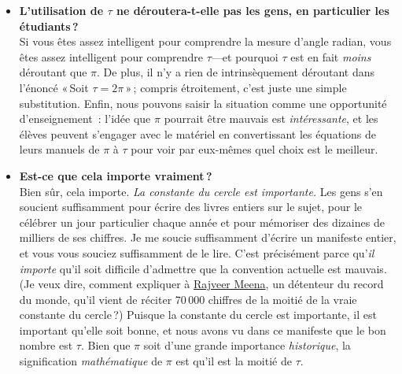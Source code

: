 \begin{itemize}
  \item \textbf{L'utilisation de $\tau$ ne déroutera-t-elle pas les gens, en particulier les étudiants\,?} \\  Si vous êtes assez intelligent pour comprendre la mesure d'angle radian, vous êtes assez intelligent pour comprendre $\tau$---et pourquoi $\tau$ est en fait \emph{moins} déroutant que $\pi$. De plus, il n'y a rien de intrinsèquement déroutant dans l'énoncé «\,Soit $\tau=2\pi$\,»\,; compris étroitement, c'est juste une simple substitution. Enfin, nous pouvons saisir la situation comme une opportunité d'enseignement~: l'idée que $\pi$ pourrait être mauvais est \emph{intéressante}, et les élèves peuvent s'engager avec le matériel en convertissant les équations de leurs manuels de $\pi$ à $\tau$ pour voir par eux-mêmes quel choix est le meilleur.

  \item \textbf{Est-ce que cela importe vraiment\,?} \\ Bien sûr, cela importe. \emph{La constante du cercle est importante.} Les gens s'en soucient suffisamment pour écrire des livres entiers sur le sujet, pour le célébrer un jour particulier chaque année et pour mémoriser des dizaines de milliers de ses chiffres. Je me soucie suffisamment d'écrire un manifeste entier, et vous vous souciez suffisamment de le lire. C'est précisément parce qu'\emph{il importe} qu'il soit difficile d'admettre que la convention actuelle est mauvais. (Je veux dire, comment expliquer à \href{https://www.guinnessworldrecords.com/world-records/most-pi-places-memorised}{Rajveer Meena}, un détenteur du record du monde, qu'il vient de réciter 70\,000 chiffres de la moitié de la vraie constante du cercle\,?) Puisque la constante du cercle est importante, il est important qu'elle soit bonne, et nous avons vu dans ce manifeste que le bon nombre est $\tau$. Bien que $\pi$ soit d'une grande importance \emph{historique}, la signification \emph{mathématique} de $\pi$ est qu'il est la moitié de $\tau$.


\end{itemize}
